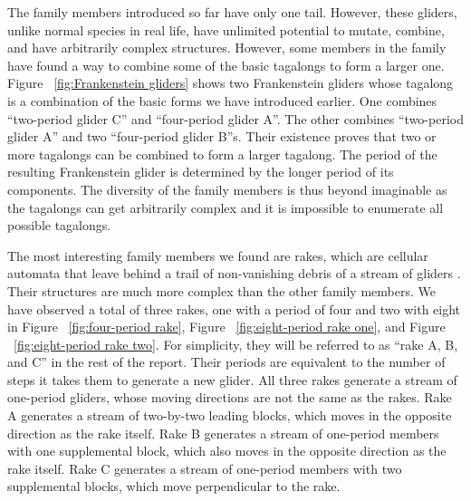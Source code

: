 \documentclass[12pt]{article}
\numberwithin{figure}{section} %
\begin{document}
The family members introduced so far have only one tail. However, these gliders, unlike normal species in real life, have unlimited potential to mutate, combine, and have arbitrarily complex structures. However, some members in the family have found a way to combine some of the basic tagalongs to form a larger one. Figure ~\ref{fig:Frankenstein gliders} shows two Frankenstein gliders whose tagalong is a combination of the basic forms we have introduced earlier. One combines “two-period glider C” and “four-period glider A”. The other combines “two-period glider A” and two “four-period glider B”s. Their existence proves that two or more tagalongs can be combined to form a larger tagalong. The period of the resulting Frankenstein glider is determined by the longer period of its components. The diversity of the family members is thus beyond imaginable as the tagalongs can get arbitrarily complex and it is impossible to enumerate all possible tagalongs. 

The most interesting family members we found are rakes, which are cellular automata that leave behind a trail of non-vanishing debris of a stream of gliders \cite{rake}. Their structures are much more complex than the other family members. We have observed a total of three rakes, one with a period of four and two with eight in Figure ~\ref{fig:four-period rake}, Figure ~\ref{fig:eight-period rake one}, and Figure ~\ref{fig:eight-period rake two}. For simplicity, they will be referred to as “rake A, B, and C” in the rest of the report. Their periods are equivalent to the number of steps it takes them to generate a new glider. All three rakes generate a stream of one-period gliders, whose moving directions are not the same as the rakes. Rake A generates a stream of two-by-two leading blocks, which moves in the opposite direction as the rake itself. Rake B generates a stream of one-period members with one supplemental block, which also moves in the opposite direction as the rake itself. Rake C generates a stream of one-period members with two supplemental blocks, which move perpendicular to the rake. 
\end{document}

